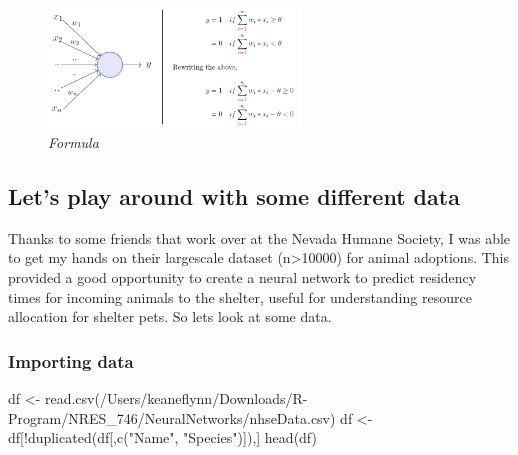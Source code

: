 \documentclass[
]{article}
\newenvironment{Shaded}{\begin{snugshade}}{\end{snugshade}}
\newcommand{\FunctionTok}[1]{\textcolor[rgb]{0.00,0.00,0.00}{#1}}
\newcommand{\NormalTok}[1]{#1}
\newcommand{\OtherTok}[1]{\textcolor[rgb]{0.56,0.35,0.01}{#1}}
\newcommand{\SpecialCharTok}[1]{\textcolor[rgb]{0.00,0.00,0.00}{#1}}
\newcommand{\StringTok}[1]{\textcolor[rgb]{0.31,0.60,0.02}{#1}}
\begin{document}
\begin{figure}
\centering
\includegraphics[width=0.6\textwidth,height=\textheight]{media/perceptronModel.png}
\caption{\emph{Formula}}
\end{figure}

\hypertarget{lets-play-around-with-some-different-data}{%
\subsection{Let's play around with some different
data}\label{lets-play-around-with-some-different-data}}

Thanks to some friends that work over at the Nevada Humane Society, I
was able to get my hands on their largescale dataset
(n\textgreater10000) for animal adoptions. This provided a good
opportunity to create a neural network to predict residency times for
incoming animals to the shelter, useful for understanding resource
allocation for shelter pets. So lets look at some data.

\hypertarget{importing-data}{%
\subsubsection{Importing data}\label{importing-data}}

\begin{Shaded}
\begin{Highlighting}[]
\NormalTok{df }\OtherTok{\textless{}{-}} \FunctionTok{read.csv}\NormalTok{(}\StringTok{\textquotesingle{}/Users/keaneflynn/Downloads/R{-}Program/NRES\_746/NeuralNetworks/nhseData.csv\textquotesingle{}}\NormalTok{)}
\NormalTok{df }\OtherTok{\textless{}{-}}\NormalTok{ df[}\SpecialCharTok{!}\FunctionTok{duplicated}\NormalTok{(df[,}\FunctionTok{c}\NormalTok{(}\StringTok{"Name"}\NormalTok{, }\StringTok{"Species"}\NormalTok{)]),] }
\FunctionTok{head}\NormalTok{(df)}
\end{Highlighting}
\end{Shaded}
\end{document}
